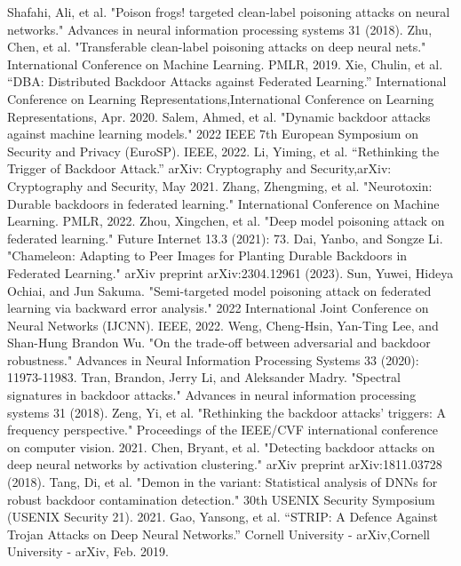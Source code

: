\documentclass[conference]{IEEEtran}
\begin{document}
\begin{thebibliography}{00}
     Shafahi, Ali, et al. "Poison frogs! targeted clean-label poisoning attacks on neural networks." Advances in neural information processing systems 31 (2018).
     Zhu, Chen, et al. "Transferable clean-label poisoning attacks on deep neural nets." International Conference on Machine Learning. PMLR, 2019.
     Xie, Chulin, et al. “DBA: Distributed Backdoor Attacks against Federated Learning.” International Conference on Learning Representations,International Conference on Learning Representations, Apr. 2020.
     Salem, Ahmed, et al. "Dynamic backdoor attacks against machine learning models." 2022 IEEE 7th European Symposium on Security and Privacy (EuroSP). IEEE, 2022.
     Li, Yiming, et al. “Rethinking the Trigger of Backdoor Attack.” arXiv: Cryptography and Security,arXiv: Cryptography and Security, May 2021.
     Zhang, Zhengming, et al. "Neurotoxin: Durable backdoors in federated learning." International Conference on Machine Learning. PMLR, 2022.
     Zhou, Xingchen, et al. "Deep model poisoning attack on federated learning." Future Internet 13.3 (2021): 73.
     Dai, Yanbo, and Songze Li. "Chameleon: Adapting to Peer Images for Planting Durable Backdoors in Federated Learning." arXiv preprint arXiv:2304.12961 (2023).
     Sun, Yuwei, Hideya Ochiai, and Jun Sakuma. "Semi-targeted model poisoning attack on federated learning via backward error analysis." 2022 International Joint Conference on Neural Networks (IJCNN). IEEE, 2022.
     Weng, Cheng-Hsin, Yan-Ting Lee, and Shan-Hung Brandon Wu. "On the trade-off between adversarial and backdoor robustness." Advances in Neural Information Processing Systems 33 (2020): 11973-11983.
     Tran, Brandon, Jerry Li, and Aleksander Madry. "Spectral signatures in backdoor attacks." Advances in neural information processing systems 31 (2018).
     Zeng, Yi, et al. "Rethinking the backdoor attacks' triggers: A frequency perspective." Proceedings of the IEEE/CVF international conference on computer vision. 2021.
     Chen, Bryant, et al. "Detecting backdoor attacks on deep neural networks by activation clustering." arXiv preprint arXiv:1811.03728 (2018).
     Tang, Di, et al. "Demon in the variant: Statistical analysis of {DNNs} for robust backdoor contamination detection." 30th USENIX Security Symposium (USENIX Security 21). 2021.
     Gao, Yansong, et al. “STRIP: A Defence Against Trojan Attacks on Deep Neural Networks.” Cornell University - arXiv,Cornell University - arXiv, Feb. 2019.

\end{thebibliography}
\end{document}
